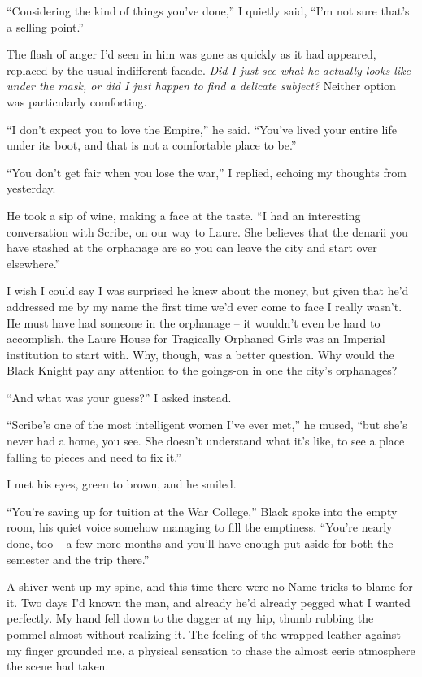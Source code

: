 \documentclass[12pt, openany]{book}
\begin{document}
“Considering the kind of things you’ve done,” I quietly said, “I’m not sure that’s a selling point.”

The flash of anger I’d seen in him was gone as quickly as it had appeared, replaced by the usual indifferent facade. \textit{Did I just see what he actually looks like under the mask, or did I just happen to find a delicate subject? }Neither option was particularly comforting.

“I don’t expect you to love the Empire,” he said. “You’ve lived your entire life under its boot, and that is not a comfortable place to be.”

“You don’t get fair when you lose the war,” I replied, echoing my thoughts from yesterday.

He took a sip of wine, making a face at the taste. “I had an interesting conversation with Scribe, on our way to Laure. She believes that the denarii you have stashed at the orphanage are so you can leave the city and start over elsewhere.”

I wish I could say I was surprised he knew about the money, but given that he’d addressed me by my name the first time we’d ever come to face I really wasn’t. He must have had someone in the orphanage – it wouldn’t even be hard to accomplish, the Laure House for Tragically Orphaned Girls was an Imperial institution to start with. Why, though, was a better question. Why would the Black Knight pay any attention to the goings-on in one the city’s orphanages? 

“And what was your guess?” I asked instead.

“Scribe’s one of the most intelligent women I’ve ever met,” he mused, “but she’s never had a home, you see. She doesn’t understand what it’s like, to see a place falling to pieces and need to fix it.”

I met his eyes, green to brown, and he smiled.

“You’re saving up for tuition at the War College,” Black spoke into the empty room, his quiet voice somehow managing to fill the emptiness. “You’re nearly done, too – a few more months and you’ll have enough put aside for both the semester and the trip there.”

A shiver went up my spine, and this time there were no Name tricks to blame for it. Two days I’d known the man, and already he’d already pegged what I wanted perfectly. My hand fell down to the dagger at my hip, thumb rubbing the pommel almost without realizing it. The feeling of the wrapped leather against my finger grounded me, a physical sensation to chase the almost eerie atmosphere the scene had taken.
\end{document}
